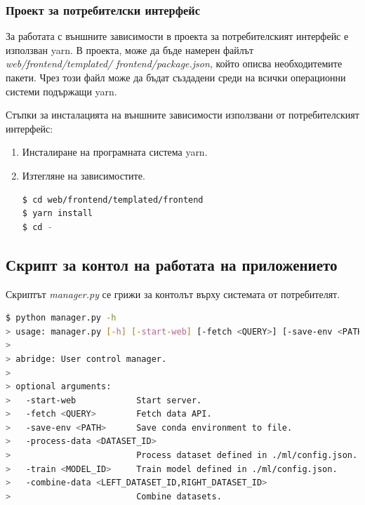 \documentclass{article}
\begin{document}
\subsubsection{Проект за потребителски интерфейс}

За работата с външните зависимости в проекта за потребителският интерфейс е използван yarn. В проекта, може да бъде
намерен файлът \textit{web/frontend/templated/ frontend/package.json}, който описва необходитемите пакети. Чрез този
файл може да бъдат създадени среди на всички операционни системи подържащи yarn.

Стъпки за инсталацията на външните зависимости използвани от потребителският интерфейс:

\begin{enumerate}
\item Инсталиране на програмната система yarn. \cite{yarn-installation}
\item Изтегляне на зависимостите.
\begin{lstlisting}[language=bash, numbers=none, caption=Изтегляне на зависимостите в проекта за потребителски интерфейс.]
$ cd web/frontend/templated/frontend
$ yarn install
$ cd -
\end{lstlisting}
\end{enumerate}

\subsection{Скрипт за контол на работата на приложението}

Скриптът \textit{manager.py} се грижи за контолът върху системата от потребителят.

\begin{lstlisting}[language=bash, numbers=none, caption=Потребителски мениджър за контрол.]
$ python manager.py -h
> usage: manager.py [-h] [-start-web] [-fetch <QUERY>] [-save-env <PATH>] [-process-data <DATASET_ID>] [-train <MODEL_ID>] [-combine-data <LEFT_DATASET_ID,RIGHT_DATASET_ID>]
>
> abridge: User control manager.
>
> optional arguments:
>   -start-web            Start server.
>   -fetch <QUERY>        Fetch data API.
>   -save-env <PATH>      Save conda environment to file.
>   -process-data <DATASET_ID>
>                         Process dataset defined in ./ml/config.json.
>   -train <MODEL_ID>     Train model defined in ./ml/config.json.
>   -combine-data <LEFT_DATASET_ID,RIGHT_DATASET_ID>
>                         Combine datasets.
\end{lstlisting}
\end{document}
